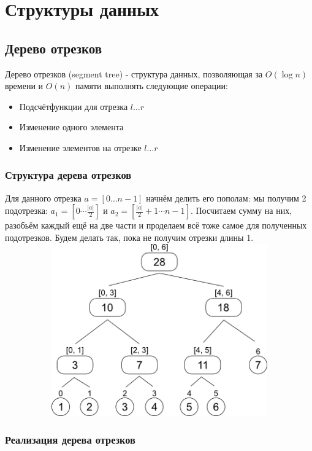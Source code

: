 \chapter{Структуры данных}
\section{Дерево отрезков}
Дерево отрезков (segment tree) - структура данных, позволяющая за $O(\log{n})$ времени и $O(n)$ памяти выполнять следующие операции: \newline
\begin{itemize}
\item{Подсчётфункции для отрезка $l\dots r$}
\item{Изменение одного элемента}
\item{Изменение элементов на отрезке $l\dots r$}
\end{itemize}
\subsection*{Структура дерева отрезков}
Для данного отрезка $a = [0\dots n - 1]$ начнём делить его пополам: мы получим 2 подотрезка: $a_1 = [0\cdots \frac{|a|}{2}]$ и $a_2 = [\frac{|a|}{2} + 1\cdots n - 1]$. Посчитаем сумму на них, разобьём каждый ещё на две части и проделаем всё тоже самое для полученных подотрезков. Будем делать так, пока не получим отрезки длины 1. \newline \newline
\includegraphics[height=210pt, width=400pt]{img/segment_tree} \newpage
\subsection*{Реализация дерева отрезков}
